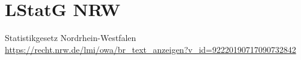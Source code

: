 \chapter{LStatG NRW}{Statistikgesetz Nordrhein-Westfalen}
\newline
\url{https://recht.nrw.de/lmi/owa/br_text_anzeigen?v_id=92220190717090732842}
